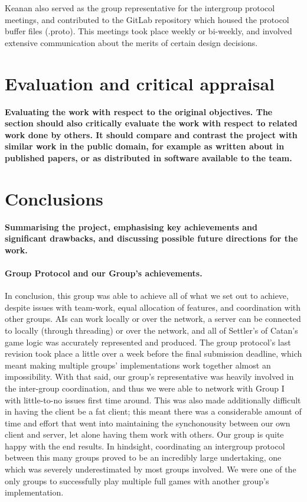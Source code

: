\documentclass[a4paper,doc,draftfirst]{apa6}
\begin{document}
Keanan also served as the group representative for the intergroup protocol meetings, and contributed to the GitLab repository which housed the protocol buffer files (.proto). This meetings took place weekly or bi-weekly, and involved extensive communication about the merits of certain design decisions. 

\section{Evaluation and critical appraisal}
\textbf{Evaluating the work with respect to the original objectives. The section should also critically evaluate the work with respect to related work done by others. It should compare and contrast the project with similar work in the public domain, for example as written about in published papers, or as distributed in software available to the team.}





\section{Conclusions}
\textbf{Summarising the project, emphasising key achievements and significant drawbacks, and discussing possible future directions for the work.}
\paragraph{Group Protocol and our Group's achievements.}
In conclusion, this group was able to achieve all of what we set out to achieve, despite issues with team-work, equal allocation of features, and coordination with other groups. AIs can work locally or over the network, a server can be connected to locally (through threading) or over the network, and all of Settler's of Catan's game logic was accurately represented and produced. The group protocol's last revision took place a little over a week before the final submission deadline, which meant making multiple groups' implementations work together almost an impossibility. With that said, our group's representative was heavily involved in the inter-group coordination, and thus we were able to network with Group I with little-to-no issues first time around. This was also made additionally difficult in having the client be a fat client; this meant there was a considerable amount of time and effort that went into maintaining the synchonousity between our own client and server, let alone having them work with others. Our group is quite happy with the end results. In hindsight, coordinating an intergroup protocol between this many groups proved to be an incredibly large undertaking, one which was severely underestimated by most groups involved. We were one of the only groups to successfully play multiple full games with another group's implementation. 
\end{document}

